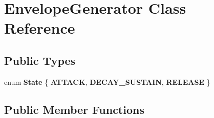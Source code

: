 \hypertarget{classEnvelopeGenerator}{\section{Envelope\-Generator Class Reference}
\label{classEnvelopeGenerator}
}
\subsection*{Public Types}
\begin{DoxyCompactItemize}
\item 
enum {\bfseries State} \{ {\bfseries A\-T\-T\-A\-C\-K}, 
{\bfseries D\-E\-C\-A\-Y\-\_\-\-S\-U\-S\-T\-A\-I\-N}, 
{\bfseries R\-E\-L\-E\-A\-S\-E}
 \}
\end{DoxyCompactItemize}
\subsection*{Public Member Functions}

